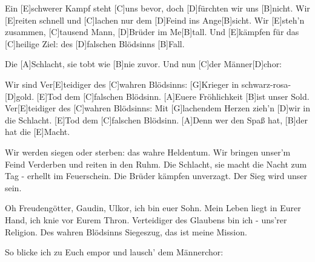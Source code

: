 

\begin{guitar}
	Ein [E]schwerer Kampf steht [C]uns bevor, doch [D]fürchten wir uns [B]nicht.
	Wir [E]reiten schnell und [C]lachen nur dem [D]Feind ins Ange[B]sicht.
	Wir [E]steh'n zusammen, [C]tausend Mann, [D]Brüder im Me[B]tall.
	Und [E]kämpfen für das [C]heilige Ziel: des [D]falschen Blödsinns [B]Fall.
	
	Die [A]Schlacht, sie tobt wie [B]nie zuvor. Und nun [C]der Männer[D]chor:
	
	Wir sind Ver[E]teidiger des [C]wahren Blödsinns:
	[G]Krieger in schwarz-rosa-[D]gold.
	[E]Tod dem [C]falschen Blödsinn.
	[A]Euere Fröhlichkeit [B]ist unser Sold.
	Ver[E]teidiger des [C]wahren Blödsinns: 
	Mit [G]lachendem Herzen zieh'n [D]wir in die Schlacht.
	[E]Tod dem [C]falschen Blödsinn. 
	[A]Denn wer den Spaß hat, [B]der hat die [E]Macht.
	
	Wir werden siegen oder sterben: das wahre Heldentum.
	Wir bringen unser'm Feind Verderben und reiten in den Ruhm.
	Die Schlacht, sie macht die Nacht zum Tag - erhellt im Feuerschein.
	Die Brüder kämpfen unverzagt. Der Sieg wird unser sein.
	
	 
	
	 
	
	Oh Freudengötter, Gaudin, Ulkor, ich bin euer Sohn.
	Mein Leben liegt in Eurer Hand, ich knie vor Eurem Thron.
	Verteidiger des Glaubens bin ich - uns'rer Religion.
	Des wahren Blödsinns Siegeszug, das ist meine Mission.
	
	\pagebreak
	
	So blicke ich zu Euch empor und lausch' dem Männerchor:
	
	 
\end{guitar}